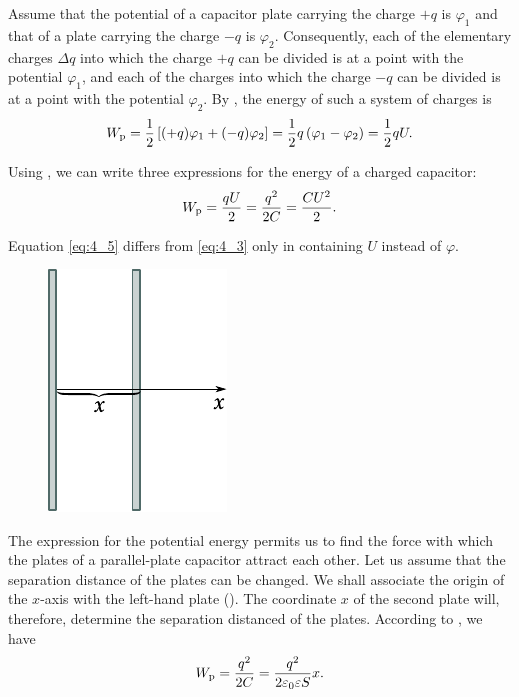Assume that the potential of a capacitor plate carrying the charge $+q$ is $\varphi_1$ and that of a plate carrying the charge $-q$ is $\varphi_2$. Consequently, each of the elementary charges $\Delta{q}$ into which the charge $+q$ can be divided is at a point with the potential $\varphi_1$, and each of the charges into which the charge $-q$ can be divided is at a point with the potential $\varphi_2$. By , the energy of such a system of charges is
\begin{equation}\label{eq:4_4}
	W_{\text{p}} = \frac{1}{2} \left[ (+q) \varphi_1 + (-q) \varphi_2\right] = \frac{1}{2} q \left(\varphi_1 - \varphi_2\right) = \frac{1}{2} q U.
\end{equation}

\noindent
Using , we can write three expressions for the energy of a charged capacitor:
\vspace{-12pt}
\begin{equation}\label{eq:4_5}
	W_{\text{p}} = \frac{q U}{2} = \frac{q^2}{2 C} = \frac{C U^2}{2}.
\end{equation}

\noindent
Equation \eqref{eq:4_5} differs from \eqref{eq:4_3} only in containing $U$ instead of $\varphi$.

\begin{figure}[t]
	\begin{center}
		\includegraphics[scale=1]{figures/ch_04/fig_4_1.pdf}
		\caption[]{}
		\label{fig:4_1}
	\end{center}
	\vspace{-0.8cm}
\end{figure}

The expression for the potential energy permits us to find the force with which the plates of a parallel-plate capacitor attract each other. Let us assume that the separation distance of the plates can be changed. We shall associate the origin of the $x$-axis with the left-hand plate (). The coordinate $x$ of the second plate will, therefore, determine the separation distanced of the plates. According to , we have
\begin{equation*}
	W_{\text{p}} = \frac{q^2}{2 C} = \frac{q^2}{2 \varepsilon_0 \varepsilon S} x.
\end{equation*}

